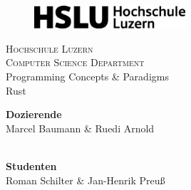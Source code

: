 \documentclass[10.5pt]{article}
\begin{document}


    \begin{titlepage}
        \begin{figure}[t]
            \centering\includegraphics[width=0.5\textwidth]{HSLU2022logo}
            \label{fig:hslu-title}
        \end{figure}

        \begin{center}
            \textsc{\LARGE{Hochschule Luzern\\}}
            \textsc{ \LARGE{Computer Science Department\\ }}
            \vspace{40mm}
            \textnormal
            Programming Concepts \& Paradigms\\
            \vspace{4mm}
            \fontsize{10mm}{7mm}\selectfont
            \textup{Rust}\\
        \end{center}

        \vspace{25mm}

        \begin{minipage}[t]{0.47\textwidth}
            \textnormal{\large{\bf Dozierende\\}}
            {\large Marcel Baumann \& Ruedi Arnold\\ \\}
        \end{minipage}\hfill\begin{minipage}[t]{0.47\textwidth}
                                \raggedleft
                                \textnormal{\large{\bf Studenten\\}}
                                {\large Roman Schilter \& Jan-Henrik Preuß}
        \end{minipage}

        \vspace{20mm}


    \end{titlepage}
\end{document}
